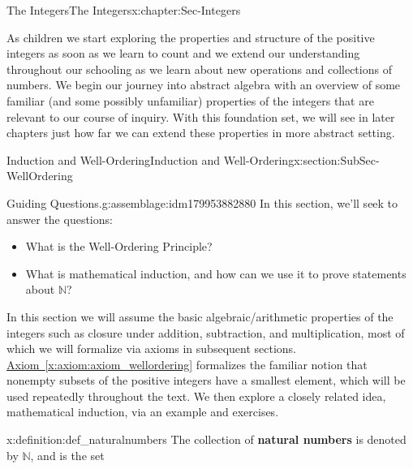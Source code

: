 \documentclass[oneside,10pt,]{book}
\newcommand{\xreffont}{\relax}
\newcommand{\terminology}[1]{\textbf{#1}}
\numberwithin{equation}{section}
\def\N{{\mathbb N}}
\begin{document}
\begin{chapterptx}{The Integers}{}{The Integers}{}{}{x:chapter:Sec-Integers}
\begin{introduction}{}%
As children we start exploring the properties and structure of the positive integers as soon as we learn to count and we extend our understanding throughout our schooling as we learn about new operations and collections of numbers. We begin our journey into abstract algebra with an overview of some familiar (and some possibly unfamiliar) properties of the integers that are relevant to our course of inquiry. With this foundation set, we will see in later chapters just how far we can extend these properties in more abstract setting.%
\end{introduction}%
%
%
\typeout{************************************************}
\typeout{************************************************}
%
\begin{sectionptx}{Induction and Well-Ordering}{}{Induction and Well-Ordering}{}{}{x:section:SubSec-WellOrdering}
\begin{assemblage}{Guiding Questions.}{g:assemblage:idm179953882880}%
In this section, we'll seek to answer the questions: %
\begin{itemize}[label=\textbullet]
\item{}What is the Well-Ordering Principle?%
\item{}What is mathematical induction, and how can we use it to prove statements about \(\N\)?%
\end{itemize}
%
\end{assemblage}
\begin{introduction}{}%
In this section we will assume the basic algebraic\slash{}arithmetic properties of the integers such as closure under addition, subtraction, and multiplication, most of which we will formalize via axioms in subsequent sections. \hyperref[x:axiom:axiom_wellordering]{Axiom~{\xreffont\ref{x:axiom:axiom_wellordering}}} formalizes the familiar notion that nonempty subsets of the positive integers have a smallest element, which will be used repeatedly throughout the text. We then explore a closely related idea, mathematical induction, via an example and exercises.%
\end{introduction}%
\begin{definition}{}{x:definition:def_naturalnumbers}%
\index{\(\N\)} The collection of \terminology{natural numbers} is denoted by \(\N\), and is the set%
\begin{equation*}

\end{equation*}
\end{definition}
\end{sectionptx}
\end{chapterptx}
\end{document}
